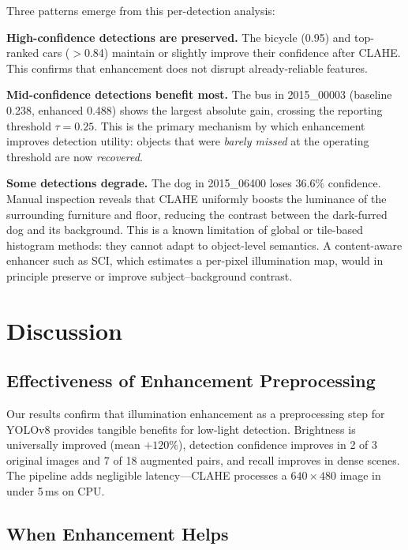 \documentclass[conference]{IEEEtran}
\begin{document}
Three patterns emerge from this per-detection analysis:

\textbf{High-confidence detections are preserved.}
The bicycle (0.95) and top-ranked cars ($>$0.84) maintain or slightly
improve their confidence after CLAHE.  This confirms that enhancement
does not disrupt already-reliable features.

\textbf{Mid-confidence detections benefit most.}
The bus in 2015\_00003 (baseline 0.238, enhanced 0.488) shows the
largest absolute gain, crossing the reporting threshold $\tau=0.25$.
This is the primary mechanism by which enhancement improves
detection utility: objects that were \emph{barely missed} at the
operating threshold are now \emph{recovered}.

\textbf{Some detections degrade.}
The dog in 2015\_06400 loses 36.6\% confidence.  Manual inspection
reveals that CLAHE uniformly boosts the luminance of the surrounding
furniture and floor, reducing the contrast between the dark-furred
dog and its background.  This is a known limitation of global or
tile-based histogram methods: they cannot adapt to object-level
semantics.  A content-aware enhancer such as SCI, which estimates a
per-pixel illumination map, would in principle preserve or improve
subject--background contrast.

\section{Discussion}
\label{sec:discussion}

\subsection{Effectiveness of Enhancement Preprocessing}

Our results confirm that illumination enhancement as a preprocessing step
for YOLOv8 provides tangible benefits for low-light detection. Brightness
is universally improved (mean $+120\%$), detection confidence improves in
2 of 3 original images and 7 of 18 augmented pairs, and recall improves
in dense scenes. The pipeline adds negligible latency---CLAHE processes a
$640{\times}480$ image in under 5\,ms on CPU.

\subsection{When Enhancement Helps}
\end{document}
